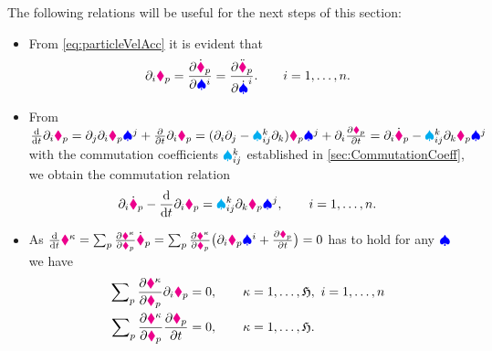 The following relations will be useful for the next steps of this section:
\begin{itemize}
\item From \eqref{eq:particleVelAcc} it is evident that
\begin{align}\label{eq:IdentityDifferentials}
 \dirDiff{\LidxI} \particlePos{\PidxI} = \pdiff[\particlePosd{\PidxI}]{\sysVelCoeff{\LidxI}} = \pdiff[\particlePosdd{\PidxI}]{\sysVelCoeffd{\LidxI}}.
 \qquad \LidxI=1,\ldots,\dimConfigSpace.
\end{align}
\item From
$
 \diff{t} \dirDiff{\LidxI} \particlePos{\PidxI}
 = \dirDiff{\LidxII} \dirDiff{\LidxI} \particlePos{\PidxI} \sysVelCoeff{\LidxII} + \pdiff{t} \dirDiff{\LidxI} \particlePos{\PidxI}
 = (\dirDiff{\LidxI} \dirDiff{\LidxII} - \BoltzSym{\LidxIII}{\LidxI}{\LidxII} \dirDiff{\LidxIII}) \particlePos{\PidxI} \sysVelCoeff{\LidxII} + \dirDiff{\LidxI} \pdiff[\particlePos{\PidxI}]{t}
 = \dirDiff{\LidxI} \particlePosd{\PidxI} - \BoltzSym{\LidxIII}{\LidxI}{\LidxII} \dirDiff{\LidxIII} \particlePos{\PidxI} \sysVelCoeff{\LidxII}
$
with the commutation coefficients $\BoltzSym{\LidxIII}{\LidxI}{\LidxII}$ established in \autoref{sec:CommutationCoeff}, we obtain the commutation relation
\begin{align}\label{eq:CommutationParticleVel}
 \dirDiff{\LidxI} \particlePosd{\PidxI} - \diff{t} \dirDiff{\LidxI} \particlePos{\PidxI} = \BoltzSym{\LidxIII}{\LidxI}{\LidxII} \dirDiff{\LidxIII} \particlePos{\PidxI} \sysVelCoeff{\LidxII},
 \qquad \LidxI=1,\ldots,\dimConfigSpace.
\end{align}
\item As
$
 \tdiff{t} \particleGeoConstraintCoeff{\CidxI}
 = \sumParticles \pdiff[\particleGeoConstraintCoeff{\CidxI}]{\particlePos{\PidxI}} \particlePosd{\PidxI}
 = \sumParticles \pdiff[\particleGeoConstraintCoeff{\CidxI}]{\particlePos{\PidxI}} \big( \dirDiff{\LidxI}\particlePos{\PidxI} \sysVelCoeff{\LidxI} + \pdiff[\particlePos{\PidxI}]{t} \big)
 = 0
$
has to hold for any $\sysVel$ we have
\begin{subequations}
\begin{align}
 \sumParticles \pdiff[\particleGeoConstraintCoeff{\CidxI}]{\particlePos{\PidxI}} \dirDiff{\LidxI}\particlePos{\PidxI} &= 0,
\qquad 
 \CidxI=1,\ldots,\numParticleConstraints, \ \LidxI=1,\ldots,\dimConfigSpace
 \label{eq:ParticleConstraintIdentity}
\\
 \sumParticles \pdiff[\particleGeoConstraintCoeff{\CidxI}]{\particlePos{\PidxI}} \pdiff[\particlePos{\PidxI}]{t} &= 0, 
\qquad 
 \CidxI=1,\ldots,\numParticleConstraints.
\end{align}
\end{subequations}
\end{itemize}

